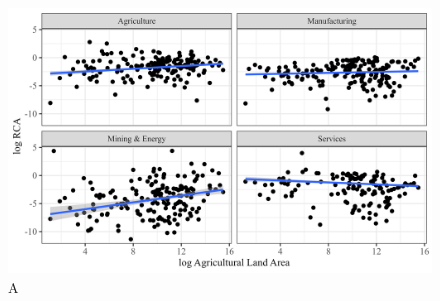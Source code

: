 \begin{figure}[!h]
    \caption{A}
    \includegraphics*[width = 0.8\linewidth]{../plots/rca_land.png}

\end{figure}

\subsection{}
